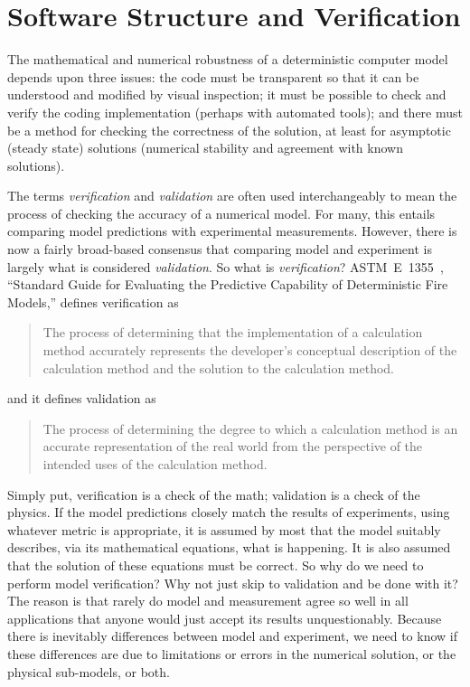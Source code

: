
\chapter{Software Structure and Verification}

The mathematical and numerical robustness of a deterministic computer model depends upon
three issues: the code must be transparent so that it can be understood and modified by visual
inspection; it must be possible to check and verify the coding implementation (perhaps with automated tools); and there must be a
method for checking the correctness of the solution, at least for asymptotic (steady state)
solutions (numerical stability and agreement with known solutions).

The terms {\em verification} and {\em validation} are often used interchangeably to mean the process of checking the
accuracy of a numerical model. For many, this entails comparing model predictions with experimental measurements. However,
there is now a fairly broad-based consensus that comparing model and experiment is largely what is considered {\em validation}. So what is
{\em verification}? ASTM~E~1355~\cite{ASTM:E1355}, ``Standard Guide for
Evaluating the Predictive Capability of Deterministic Fire Models,'' defines verification as
\begin{quote}
The process of determining that the implementation of a calculation method accurately
represents the developer's conceptual description of the calculation method and the solution to the calculation method.
\end{quote}
and it defines validation as
\begin{quote}
The process of determining the degree to which a calculation method is an accurate representation of the real world
from the perspective of the intended uses of the calculation method.
\end{quote}
Simply put, verification is a check of the math; validation is a check of the physics. If the model predictions closely match
the results of experiments, using whatever metric is appropriate, it is assumed by most that the model suitably describes, via
its mathematical equations, what is happening. It is also assumed that the solution of these equations must be correct. So why do
we need to perform model verification? Why not just skip to validation and be done with it? The reason is that rarely do model and
measurement agree so well in all applications that anyone would just accept its results unquestionably. Because there is
inevitably differences between model and experiment, we need to know if these differences are due to limitations or errors in
the numerical solution, or the physical sub-models, or both.

